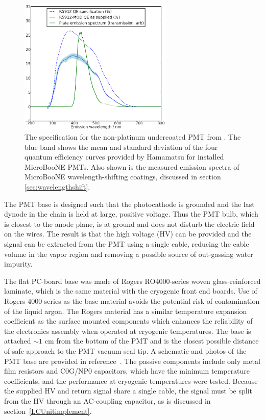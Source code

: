 \begin{figure}[t]
\centering 
\includegraphics[width=0.65\textwidth]{./light_figures/PlateSpectra.png}
\caption{The specification for the non-platinum undercoated PMT from \cite{Hamamatsu-Datasheet8inch}.  The blue band shows the mean and standard deviation of the four quantum efficiency curves provided by Hamamatsu for installed MicroBooNE PMTs. Also shown is the measured emission spectra of MicroBooNE wavelength-shifting coatings, discussed in section \ref{sec:wavelengthshift}.  \cite{Jones:2015bya}
 \label{fig:TPBSpectraPlate}  }
\end{figure}


The PMT base is designed such that the photocathode is 
grounded and the last dynode in the chain is held at large, positive voltage. 
Thus the PMT bulb, which is closest to the \lartpc anode plane, 
is at ground and does not disturb the electric field on the wires.  
The result is that the high voltage (HV) can be provided and the signal can be extracted from the PMT using a single cable, 
reducing the cable volume in the vapor region and removing a possible source of out-gassing water impurity.

The flat PC-board base was made of Rogers RO4000-series woven glass-reinforced laminate, 
which is the same material with the \lartpc cryogenic front end boards.  Use of Rogers 4000 series as the base material avoids the potential risk of contamination of the liquid argon. The Rogers material has a similar temperature expansion coefficient as the surface mounted components which enhances the reliability of the electronics assembly when operated at cryogenic temperatures.  The base is attached $\sim 1$ cm from the bottom of the PMT and is the closest possible distance of safe approach to the PMT vacuum seal tip.   
A schematic and photos of the PMT base are provided in reference~\cite{Briese:2013wua}. 
The passive components include only metal film resistors and C0G/NP0 capacitors, 
which have the minimum temperature coefficients, and the performance at cryogenic temperatures were tested.  
Because the supplied HV and return signal share a single cable, the signal must be split from the HV through an AC-coupling capacitor, as is discussed in section~\ref{LCUnitimplement}.

